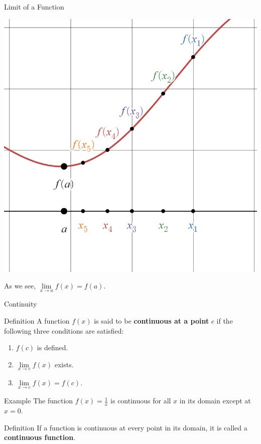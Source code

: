 \documentclass{beamer}
\begin{document}
\begin{frame}{Limit of a Function}

      \begin{center}

    \includegraphics[height=0.75\textheight, keepaspectratio]{cont5.png}
  \end{center}\pause

  As we see, $\lim\limits_{x\to a} f(x) = f(a)$.


\end{frame}




\begin{frame}{Continuity}
    \begin{block}{Definition}
        A function $f(x)$ is said to be \textbf{continuous at a point} $c$ if the following three conditions are satisfied:
        \begin{enumerate}
            \item $f(c)$ is defined.
            \item $\lim\limits_{x \to c} f(x)$ exists.
            \item $\lim\limits_{x \to c} f(x) = f(c)$.
        \end{enumerate}
    \end{block}
\pause
    \begin{exampleblock}{Example}
        The function $f(x) = \frac{1}{x}$ is continuous for all $x$ in its domain except at $x = 0$.
    \end{exampleblock}
\pause
    \begin{block}{Definition}
        If a function is continuous at every point in its domain, it is called a \textbf{continuous function}.
    \end{block}
\end{frame}
\end{document}
